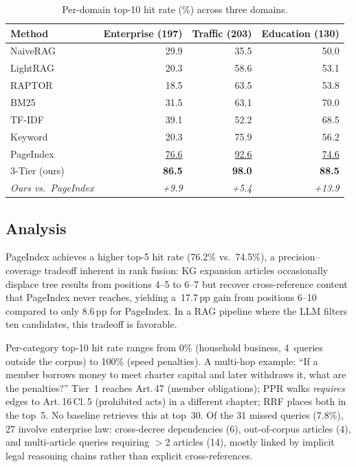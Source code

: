 \documentclass{IOS-Book-Article}
\begin{document}
\begin{table}[H]
\centering\footnotesize
\caption{Per-domain top-10 hit rate (\%) across three domains.}
\label{tab:domain-results}
\begin{tabular}{l@{\hskip 4pt}r@{\hskip 4pt}r@{\hskip 4pt}r}
\toprule
\textbf{Method} & \textbf{Enterprise (197)} & \textbf{Traffic (203)} & \textbf{Education (130)} \\
\midrule
NaiveRAG & 29.9 & 35.5 & 50.0 \\
LightRAG & 20.3 & 58.6 & 53.1 \\
RAPTOR & 18.5 & 63.5 & 53.8 \\
BM25 & 31.5 & 63.1 & 70.0 \\
TF-IDF & 39.1 & 52.2 & 68.5 \\
Keyword & 20.3 & 75.9 & 56.2 \\
PageIndex & \underline{76.6} & \underline{92.6} & \underline{74.6} \\
3-Tier (ours) & \textbf{86.5} & \textbf{98.0} & \textbf{88.5} \\
\midrule
\textit{Ours vs.\ PageIndex} & \textit{+9.9} & \textit{+5.4} & \textit{+13.9} \\
\bottomrule
\end{tabular}
\end{table}

\subsection{Analysis}

PageIndex achieves a higher top-5 hit rate (76.2\% vs.\ 74.5\%), a precision--coverage tradeoff inherent in rank fusion: KG expansion articles occasionally displace tree results from positions 4--5 to 6--7 but recover cross-reference content that PageIndex never reaches, yielding a~17.7\,pp gain from positions 6--10 compared to only 8.6\,pp for PageIndex. In a RAG pipeline where the LLM filters ten candidates, this tradeoff is favorable.

Per-category top-10 hit rate ranges from 0\% (household business, 4~queries outside the corpus) to 100\% (speed penalties). A multi-hop example: ``If a member borrows money to meet charter capital and later withdraws it, what are the penalties?'' Tier~1 reaches Art.\,47 (member obligations); PPR walks \textit{requires} edges to Art.\,16\,Cl.\,5 (prohibited acts) in a different chapter; RRF places both in the top~5. No baseline retrieves this at top~30. Of the 31 missed queries (7.8\%), 27 involve enterprise law: cross-decree dependencies (6), out-of-corpus articles (4), and multi-article queries requiring $>$2 articles (14), mostly linked by implicit legal reasoning chains rather than explicit cross-references.
\end{document}
